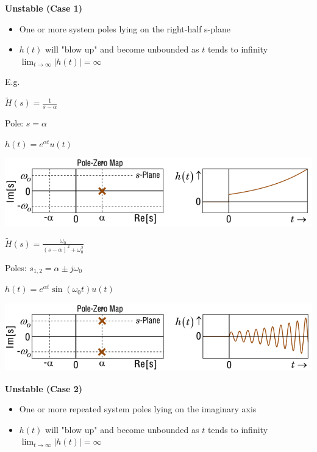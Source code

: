 \documentclass[landscape,a4paper]{extarticle}
\newenvironment{Figure}
  {\par\medskip\noindent\minipage{\linewidth}}
  {\endminipage\par\medskip}
\begin{document}
\begin{multicols*}{5}
    \textbf{Unstable (Case 1)}
    \begin{itemize}
        \item One or more system poles lying on the right-half s-plane
        \item $h(t)$ will "blow up" and become unbounded as $t$ tends to infinity\\
        $\lim_{t \to \infty}|h(t)| = \infty$
    \end{itemize}

    E.g.

    $\tilde{H}(s) = \frac{1}{s - \alpha}$

    Pole: $s = \alpha$

    $h(t) = e^{\alpha t}u(t)$

    \begin{Figure}
        \centering
        \includegraphics[width=\linewidth]{unstableCase1_1.png}        
    \end{Figure}

    $\tilde{H}(s) = \frac{\omega_0}{(s - \alpha)^2 + \omega_0^2}$

    Poles: $s_{1,2} = \alpha \pm j\omega_0$

    $h(t) = e^{\alpha t}\sin (\omega_0 t) u (t)$

    \begin{Figure}
        \centering
        \includegraphics[width=\linewidth]{unstableCase1_2.png}        
    \end{Figure}

    \textbf{Unstable (Case 2)}
    \begin{itemize}
        \item One or more repeated system poles lying on the imaginary axis
        \item $h(t)$ will "blow up" and become unbounded as $t$ tends to infinity\\
        $\lim_{t \to \infty}|h(t)| = \infty$
    \end{itemize}


\end{multicols*}
\end{document}
